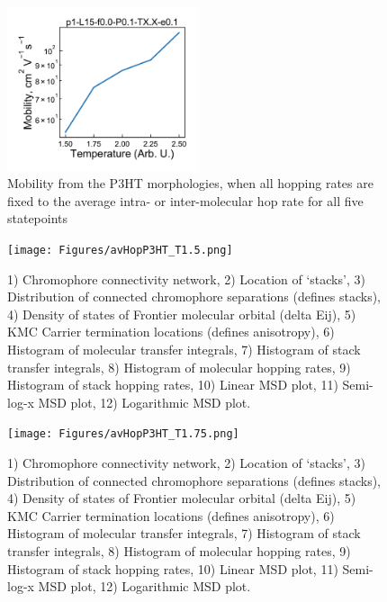 \documentclass[12pt]{article}
\begin{document}
\begin{figure}[h]\centering
	\includegraphics[width=0.5\textwidth]{Figures/2hoursAvHopGlobalMobility.pdf}
    \caption{Mobility from the P3HT morphologies, when all hopping rates are fixed to the average intra- or inter-molecular hop rate for all five statepoints}
	\label{fig:mobGlobal}
\end{figure}


\begin{figure}[h]\centering
	\texttt{[image: Figures/avHopP3HT\_T1.5.png]}
    \caption{   1) Chromophore connectivity network, 
                2) Location of `stacks', 
                3) Distribution of connected chromophore separations (defines stacks),
                4) Density of states of Frontier molecular orbital (delta Eij),
                5) KMC Carrier termination locations (defines anisotropy),
                6) Histogram of molecular transfer integrals,
                7) Histogram of stack transfer integrals,
                8) Histogram of molecular hopping rates,
                9) Histogram of stack hopping rates,
                10) Linear MSD plot,
                11) Semi-log-x MSD plot,
                12) Logarithmic MSD plot.}
	\label{fig:avHopT1.5}
\end{figure}


\begin{figure}[h]\centering
	\texttt{[image: Figures/avHopP3HT\_T1.75.png]}
    \caption{   1) Chromophore connectivity network, 
                2) Location of `stacks', 
                3) Distribution of connected chromophore separations (defines stacks),
                4) Density of states of Frontier molecular orbital (delta Eij),
                5) KMC Carrier termination locations (defines anisotropy),
                6) Histogram of molecular transfer integrals,
                7) Histogram of stack transfer integrals,
                8) Histogram of molecular hopping rates,
                9) Histogram of stack hopping rates,
                10) Linear MSD plot,
                11) Semi-log-x MSD plot,
                12) Logarithmic MSD plot.}
	\label{fig:avHopT1.75}
\end{figure}
\end{document}
